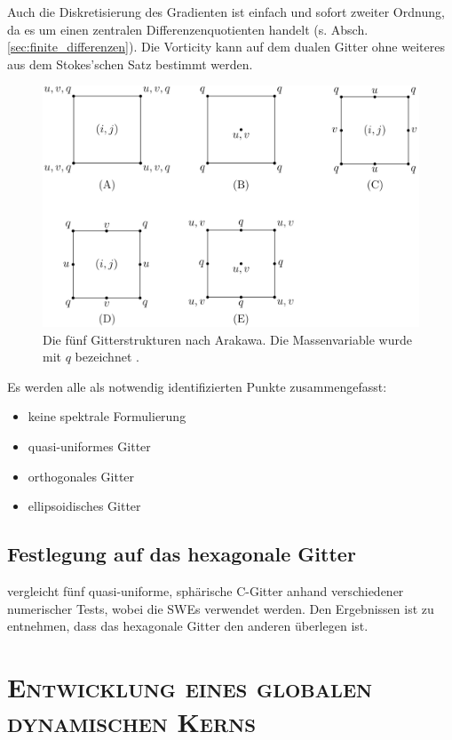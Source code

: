 \documentclass{book}
\begin{document}
Auch die Diskretisierung des Gradienten ist einfach und sofort zweiter Ordnung, da es um einen zentralen Differenzenquotienten handelt (s. Absch. \ref{sec:finite_differenzen}). Die Vorticity kann auf dem dualen Gitter ohne weiteres aus dem Stokes'schen Satz bestimmt werden.

\begin{figure}
\centering
\includegraphics[width = .6\textwidth]{figs/arakawa.png}
\caption{Die fünf Gitterstrukturen nach Arakawa. Die Massenvariable wurde mit $q$ bezeichnet \cite{arakawa_grids_figure}.}
\label{fig:arakawa}
\end{figure}
%
Es werden alle als notwendig identifizierten Punkte zusammengefasst:
%
\begin{itemize}
\item keine spektrale Formulierung
\item quasi-uniformes Gitter
\item orthogonales Gitter
\item ellipsoidisches Gitter
\end{itemize}

\section{Festlegung auf das hexagonale Gitter}
\label{sec:festlegung_auf_das_hexagonale_gitter}

\cite{weller} vergleicht fünf quasi-uniforme, sphärische C-Gitter anhand verschiedener numerischer Tests, wobei die SWEs verwendet werden. Den Ergebnissen ist zu entnehmen, dass das hexagonale Gitter den anderen überlegen ist.

\chapter{\normalfont\textsc{Entwicklung eines globalen dynamischen Kerns}}
\label{chap:entwicklung_eines_globalen_dynamischen_kerns}
\end{document}
